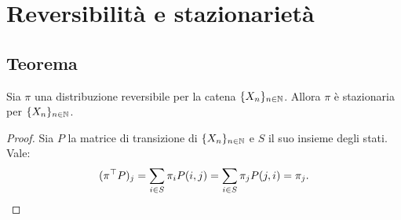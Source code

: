 %
%
%
%


\section{Reversibilità e stazionarietà}


\subsection{Teorema}

\begin{thm}
	Sia $\pi$ una distribuzione reversibile per la catena $\{X_n\}_{n\in\mathbb N}$. Allora $\pi$ è stazionaria per $\{X_n\}_{n\in\mathbb N}$.
\end{thm}
\begin{proof}
	Sia $P$ la matrice di transizione di $\{X_n\}_{n\in\mathbb N}$ e $S$ il suo insieme degli stati. Vale:
	\begin{equation*}
		(\pi^\top P)_j = \sum_{i\in S} \pi_i P(i,j) = \sum_{i\in S} \pi_j P(j,i) = \pi_j \text. \qedhere
	\end{equation*}
\end{proof}
